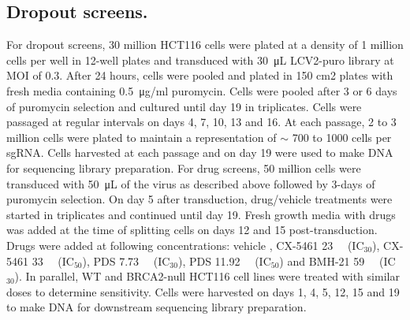 \subsection{Dropout screens.}
For dropout screens, 30 million HCT116 cells were plated at a density of 1 million cells per well in 12-well plates and transduced with \SI{30}{\micro\liter} LCV2-puro library at MOI of 0.3. After 24 hours, cells were pooled and plated in 150 cm2 plates with fresh media containing \SI{0.5}{\micro\gram}/ml puromycin. Cells were pooled after 3 or 6 days of puromycin selection and cultured until day 19 in triplicates. Cells were passaged at regular intervals on days 4, 7, 10, 13 and 16. At each passage, 2 to 3 million cells were plated to maintain a representation of $\sim$ 700 to 1000 cells per sgRNA. Cells harvested at each passage and on day 19 were used to make DNA for sequencing library preparation.
For drug screens, 50 million cells were transduced with \SI{50}{\micro\liter} of the virus as described above followed by 3-days of puromycin selection. On day 5 after transduction, drug/vehicle treatments were started in triplicates and continued until day 19. Fresh growth media with drugs was added at the time of splitting cells on days 12 and 15 post-transduction. Drugs were added at following concentrations: vehicle , CX-5461 \SI{23}{\nano\Molar} (IC$_{30}$), CX-5461 \SI{33}{\nano\Molar} (IC$_{50}$), PDS \SI{7.73}{\micro\Molar} (IC$_{30}$), PDS \SI{11.92}{\micro\Molar} (IC$_{50}$) and BMH-21 \SI{59}{\nano\Molar} (IC$_{30}$). In parallel, WT and BRCA2-null HCT116 cell lines were treated with similar doses to determine sensitivity. Cells were harvested on days 1, 4, 5, 12, 15 and 19 to make DNA for downstream sequencing library preparation. 

